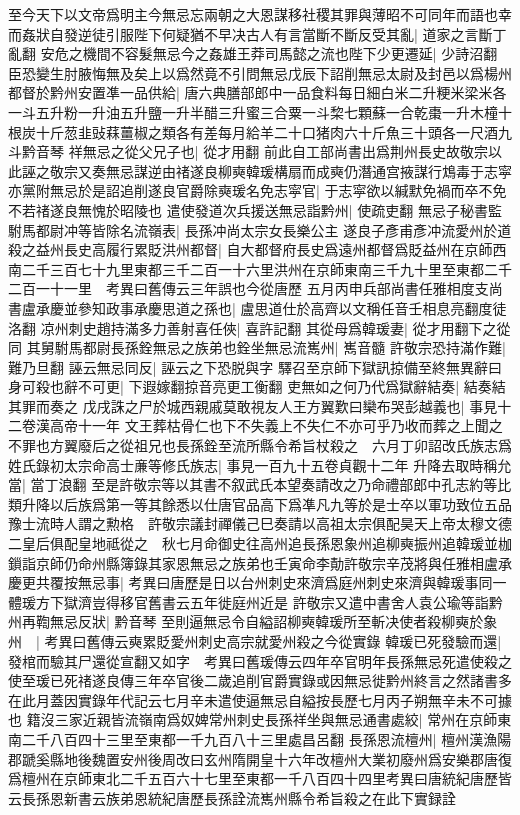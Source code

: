 至今天下以文帝爲明主今無忌忘兩朝之大恩謀移社稷其罪與薄昭不可同年而語也幸而姦狀自發逆徒引服陛下何疑猶不早决古人有言當斷不斷反受其亂|{
	道家之言斷丁亂翻}
安危之機間不容髮無忌今之姦雄王莽司馬懿之流也陛下少更遷延|{
	少詩沼翻}
臣恐變生肘腋悔無及矣上以爲然竟不引問無忌戊辰下詔削無忌太尉及封邑以爲楊州都督於黔州安置凖一品供給|{
	唐六典膳部郎中一品食料每日細白米二升粳米梁米各一斗五升粉一升油五升鹽一升半醋三升蜜三合粟一斗棃七顆蘇一合乾棗一升木橦十根炭十斤䓤韭䜴䔉薑椒之類各有差每月給羊二十口猪肉六十斤魚三十頭各一尺酒九斗黔音琴}
祥無忌之從父兄子也|{
	從才用翻}
前此自工部尚書出爲荆州長史故敬宗以此誣之敬宗又奏無忌謀逆由禇遂良柳奭韓瑗構扇而成奭仍潛通宫掖謀行鴆毒于志寜亦黨附無忌於是詔追削遂良官爵除奭瑗名免志寜官|{
	于志寜欲以緘默免禍而卒不免不若禇遂良無愧於昭陵也}
遣使發道次兵援送無忌詣黔州|{
	使疏吏翻}
無忌子秘書監駙馬都尉冲等皆除名流嶺表|{
	長孫冲尚太宗女長樂公主}
遂良子彥甫彥冲流愛州於道殺之益州長史高履行累貶洪州都督|{
	自大都督府長史爲遠州都督爲貶益州在京師西南二千三百七十九里東都三千二百一十六里洪州在京師東南三千九十里至東都二千二百一十一里　考異曰舊傳云三年誤也今從唐歷}
五月丙申兵部尚書任雅相度支尚書盧承慶並參知政事承慶思道之孫也|{
	盧思道仕於高齊以文稱任音壬相息亮翻度徒洛翻}
凉州刺史趙持滿多力善射喜任俠|{
	喜許記翻}
其從母爲韓瑗妻|{
	從才用翻下之從同}
其舅駙馬都尉長孫銓無忌之族弟也銓坐無忌流嶲州|{
	嶲音髓}
許敬宗恐持滿作難|{
	難乃旦翻}
誣云無忌同反|{
	誣云之下恐脱與字}
驛召至京師下獄訊掠備至終無異辭曰身可殺也辭不可更|{
	下遐嫁翻掠音亮更工衡翻}
吏無如之何乃代爲獄辭結奏|{
	結奏結其罪而奏之}
戊戌誅之尸於城西親戚莫敢視友人王方翼歎曰欒布哭彭越義也|{
	事見十二卷漢高帝十一年}
文王葬枯骨仁也下不失義上不失仁不亦可乎乃收而葬之上聞之不罪也方翼廢后之從祖兄也長孫銓至流所縣令希旨杖殺之　六月丁卯詔改氏族志爲姓氏錄初太宗命高士亷等修氏族志|{
	事見一百九十五卷貞觀十二年}
升降去取時稱允當|{
	當丁浪翻}
至是許敬宗等以其書不叙武氏本望奏請改之乃命禮部郎中孔志約等比類升降以后族爲第一等其餘悉以仕唐官品高下爲凖凡九等於是士卒以軍功致位五品豫士流時人謂之勲格　許敬宗議封禪儀己巳奏請以高祖太宗俱配昊天上帝太穆文德二皇后俱配皇地祗從之　秋七月命御史往高州追長孫恩象州追柳奭振州追韓瑗並枷鎻詣京師仍命州縣簿錄其家恩無忌之族弟也壬寅命李勣許敬宗辛茂將與任雅相盧承慶更共覆按無忌事|{
	考異曰唐歷是日以台州刺史來濟爲庭州刺史來濟與韓瑗事同一體瑗方下獄濟豈得移官舊書云五年徙庭州近是}
許敬宗又遣中書舍人袁公瑜等詣黔州再鞫無忌反狀|{
	黔音琴}
至則逼無忌令自縊詔柳奭韓瑗所至斬决使者殺柳奭於象州　|{
	考異曰舊傳云奭累貶愛州刺史高宗就愛州殺之今從實錄}
韓瑗已死發驗而還|{
	發棺而驗其尸還從宣翻又如字　考異曰舊瑗傳云四年卒官明年長孫無忌死遣使殺之使至瑗已死禇遂良傳三年卒官後二歲追削官爵實錄或因無忌徙黔州終言之然諸書多在此月蓋因實錄年代記云七月辛未遣使逼無忌自縊按長歷七月丙子朔無辛未不可據也}
籍沒三家近親皆流嶺南爲奴婢常州刺史長孫祥坐與無忌通書處絞|{
	常州在京師東南二千八百四十三里至東都一千九百八十三里處昌呂翻}
長孫恩流檀州|{
	檀州漢漁陽郡蹏奚縣地後魏置安州後周改曰玄州隋開皇十六年改檀州大業初廢州爲安樂郡唐復爲檀州在京師東北二千五百六十七里至東都一千八百四十四里考異曰唐統紀唐歷皆云長孫恩新書云族弟恩統紀唐歷長孫詮流嶲州縣令希旨殺之在此下實録詮}


